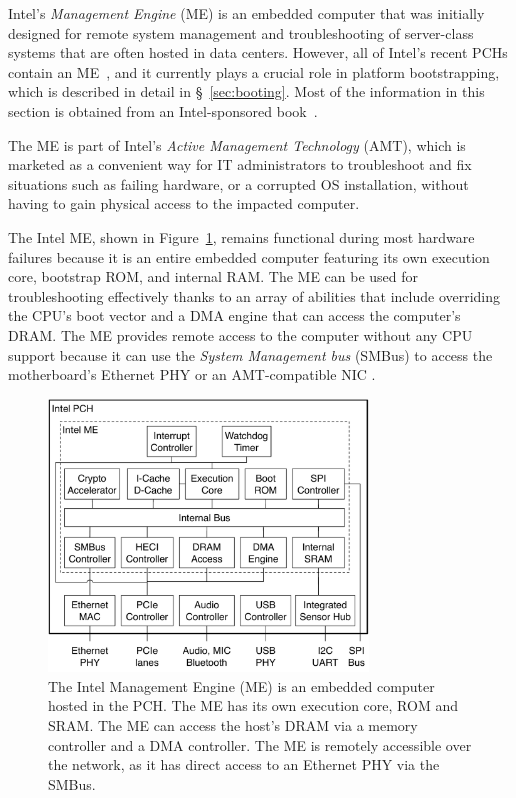 \label{sec:intel_me}

Intel's \textit{Management Engine} (ME) is an embedded computer that was
initially designed for remote system management and troubleshooting of
server-class systems that are often hosted in data centers. However, all of
Intel's recent PCHs contain an ME~\cite{intel2013mefw}, and it currently plays
a crucial role in platform bootstrapping, which is described in detail in
\S~\ref{sec:booting}. Most of the information in this section is obtained from
an Intel-sponsored book~\cite{ruan2014intelme}.

The ME is part of Intel's \textit{Active Management Technology} (AMT), which is
marketed as a convenient way for IT administrators to troubleshoot and fix
situations such as failing hardware, or a corrupted OS installation, without
having to gain physical access to the impacted computer.

The Intel ME, shown in Figure~\ref{fig:intel_me}, remains functional during
most hardware failures because it is an entire embedded computer featuring its
own execution core, bootstrap ROM, and internal RAM. The ME can be used for
troubleshooting effectively thanks to an array of abilities that include
overriding the CPU's boot vector and a DMA engine that can access the
computer's DRAM. The ME provides remote access to the computer without any CPU
support because it can use the \textit{System Management bus} (SMBus) to access
the motherboard's Ethernet PHY or an AMT-compatible NIC
\cite{intel2015chipset}.

\begin{figure}[hbt]
  \centering
  \includegraphics[width=85mm]{figures/intel_me.pdf}
  \caption{
    The Intel Management Engine (ME) is an embedded computer hosted in the
    PCH. The ME has its own execution core, ROM and SRAM. The ME can access the
    host's DRAM via a memory controller and a DMA controller. The ME is
    remotely accessible over the network, as it has direct access to an
    Ethernet PHY via the SMBus.
  }
  \label{fig:intel_me}
\end{figure}

